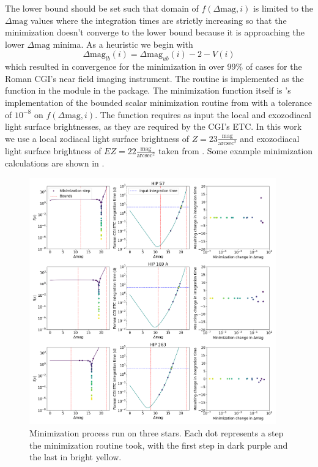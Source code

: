 The lower bound should be set such that domain of $f\left(\Delta\textrm{mag},
i\right)$ is limited to the $\Delta\textrm{mag}$ values where the integration
times are strictly increasing so that the minimization doesn't converge to the
lower bound because it is approaching the lower $\Delta\textrm{mag}$ minima. As
a heuristic we begin with
\begin{equation}
  \Delta\textrm{mag}_{lb}(i) = \Delta\textrm{mag}_{ub}(i) - 2 - V(i)
  \label{eq:dMag_lb}
\end{equation}
which resulted in convergence for the minimization in over 99\% of cases for
the Roman CGI's near field imaging instrument. The routine is implemented
as the  function in the 
module in the  package. The minimization function itself
is 's \citep{virtanenSciPyFundamental2020} implementation of the
bounded scalar minimization routine from \citet{forsytheComputerMethods1977}
with a tolerance of $10^{-8}$ on $f(\Delta\textrm{mag}, i)$. The function
requires as input the local and exozodiacal light surface brightnesses,
as they are required by the CGI's ETC. In this work we use a local zodiacal
light surface brightness of $Z=23
\frac{\textrm{mag}}{\textrm{arcsec}^2}$ and exozodiacal light surface
brightness of $EZ=22 \frac{\textrm{mag}}{\textrm{arcsec}^2}$
taken from \citet{starkMaximizingExoEarthCandidate2014}. Some example
minimization calculations are shown in .
\begin{figure}
  \begin{center}
    \includegraphics[width=0.95\textwidth]{ch2/figures/minimzation_star_comp.png}
  \end{center}
  \caption{Minimization process run on three stars. Each dot represents a step the
  minimization routine took, with the first step in dark purple and the last in
bright yellow.}
  \label{fig:minimization_star_comp}
\end{figure}

